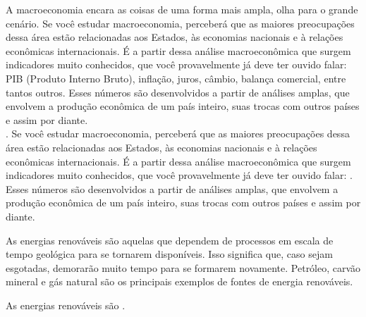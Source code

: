 \documentclass[12pt,a4paper,brazil]{article}
\begin{document}
A macroeconomia encara as coisas de uma forma mais ampla, olha para o grande cenário. Se você estudar macroeconomia, perceberá que as maiores preocupações dessa área estão relacionadas aos Estados, às economias nacionais e à relações econômicas internacionais. É a partir dessa análise macroeconômica que surgem indicadores muito conhecidos, que você provavelmente já deve ter ouvido falar: PIB (Produto Interno Bruto), inflação, juros, câmbio, balança comercial, entre tantos outros. Esses números são desenvolvidos a partir de análises amplas, que envolvem a produção econômica de um país inteiro, suas trocas com outros países e assim por diante.\\


. Se você estudar macroeconomia, perceberá que as maiores preocupações dessa área estão relacionadas aos Estados, às economias nacionais e à relações econômicas internacionais. É a partir dessa análise macroeconômica que surgem indicadores muito conhecidos, que você provavelmente já deve ter ouvido falar: . Esses números são desenvolvidos a partir de análises amplas, que envolvem a produção econômica de um país inteiro, suas trocas com outros países e assim por diante.

\newpage


As energias renováveis são aquelas que dependem de processos em escala de tempo geológica para se tornarem disponíveis. Isso significa que, caso sejam esgotadas, demorarão muito tempo para se formarem novamente. Petróleo, carvão mineral e gás natural são os principais exemplos de fontes de energia renováveis.

As energias renováveis são .\\

\end{document}
